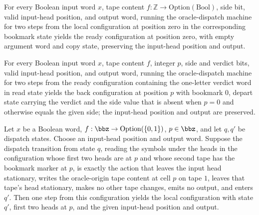 \begin{theorem}
\label{Turing.oraclePrepare_zero}
\leanok
{}
For every Boolean input word $x$, tape content
$f\colon\mathbb{Z}\to\mathrm{Option}(\mathrm{Bool})$, side bit, valid input-head
position, and output word, running the oracle-dispatch machine for two steps from the
local configuration at position zero in the corresponding bookmark state yields the
ready configuration at position zero, with empty argument word and copy state,
preserving the input-head position and output.
\end{theorem}

\begin{theorem}
\label{Turing.oracleRestore_cell}
\leanok
{}
For every Boolean input word $x$, tape content $f$, integer $p$, side and verdict bits,
valid input-head position, and output word, running the oracle-dispatch machine for two
steps from the ready configuration containing the one-letter verdict word in read state
yields the back configuration at position $p$ with bookmark $0$, depart state carrying
the verdict and the side value that is absent when $p=0$ and otherwise equals the given
side; the input-head position and output are preserved.
\end{theorem}

\begin{theorem}
\label{Turing.oracleMarker_step}
\leanok
{}
Let $x$ be a Boolean word, $f:\bbz\to\mathrm{Option}(\{0,1\})$, $p\in\bbz$, and let
$q,q'$ be dispatch states. Choose an input-head position and output word. Suppose the
dispatch transition from state $q$, reading the symbols under the heads in the
configuration whose first two heads are at $p$ and whose second tape has the bookmark
marker at $p$, is exactly the action that leaves the input head stationary, writes the
oracle-origin tape content at cell $p$ on tape $1$, leaves that tape's head stationary,
makes no other tape changes, emits no output, and enters $q'$. Then one step from this
configuration yields the local configuration with state $q'$, first two heads at $p$,
and the given input-head position and output.
\end{theorem}

